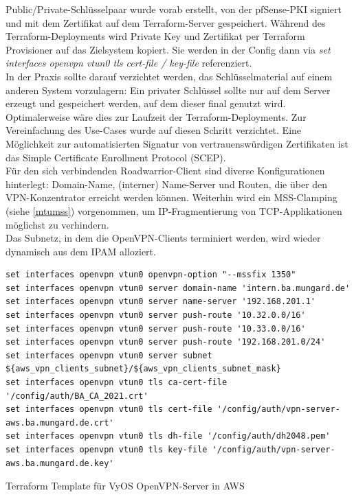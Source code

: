 Public/Private-Schlüsselpaar wurde vorab erstellt, von der pfSense-PKI signiert und mit dem Zertifikat auf dem Terraform-Server gespeichert. Während des Terraform-Deployments wird Private Key und Zertifikat per Terraform Provisioner auf das Zielsystem kopiert. Sie werden in der Config dann via \textit{set interfaces openvpn vtun0 tls cert-file / key-file} referenziert.\\
In der Praxis sollte darauf verzichtet werden, das Schlüsselmaterial \glqq auf einem anderen System vorzulagern\grqq{}: Ein privater Schlüssel sollte nur auf dem Server erzeugt und gespeichert werden, auf dem dieser final genutzt wird. Optimalerweise wäre dies zur Laufzeit der Terraform-Deployments. Zur Vereinfachung des Use-Cases wurde auf diesen Schritt verzichtet. Eine Möglichkeit zur automatisierten Signatur von vertrauenswürdigen Zertifikaten ist das Simple Certificate Enrollment Protocol (SCEP)\cite[S.554]{Schmeh2013}.\\
Für den sich verbindenden Roadwarrior-Client sind diverse Konfigurationen hinterlegt: Domain-Name, (interner) Name-Server und Routen, die über den VPN-Konzentrator erreicht werden können.
Weiterhin wird ein MSS-Clamping (siehe \ref{mtumss}) vorgenommen, um IP-Fragmentierung von TCP-Applikationen möglichst zu verhindern.\\
Das Subnetz, in dem die OpenVPN-Clients terminiert werden, wird wieder dynamisch aus dem IPAM alloziert.
\begin{listing}[h]
\begin{verbatim}
set interfaces openvpn vtun0 openvpn-option "--mssfix 1350"
set interfaces openvpn vtun0 server domain-name 'intern.ba.mungard.de'
set interfaces openvpn vtun0 server name-server '192.168.201.1'
set interfaces openvpn vtun0 server push-route '10.32.0.0/16'
set interfaces openvpn vtun0 server push-route '10.33.0.0/16'
set interfaces openvpn vtun0 server push-route '192.168.201.0/24'
set interfaces openvpn vtun0 server subnet ${aws_vpn_clients_subnet}/${aws_vpn_clients_subnet_mask}
set interfaces openvpn vtun0 tls ca-cert-file '/config/auth/BA_CA_2021.crt'
set interfaces openvpn vtun0 tls cert-file '/config/auth/vpn-server-aws.ba.mungard.de.crt'
set interfaces openvpn vtun0 tls dh-file '/config/auth/dh2048.pem'
set interfaces openvpn vtun0 tls key-file '/config/auth/vpn-server-aws.ba.mungard.de.key'
\end{verbatim}
\caption{Terraform Template für VyOS OpenVPN-Server in AWS}
\label{vpn-c2s-server-config}
\end{listing}

